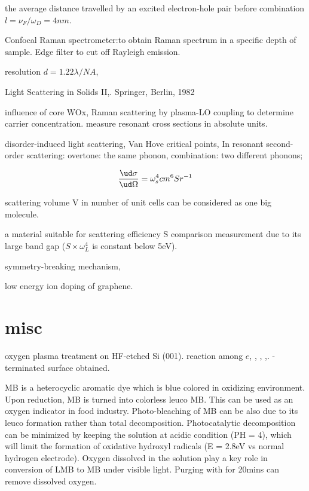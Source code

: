 the average distance travelled by an excited electron-hole pair before combination $l=\nu_F/\omega_D=4nm$.

Confocal Raman spectrometer:to obtain Raman spectrum in a specific depth of sample. Edge filter to cut off Rayleigh emission.

resolution $d= 1.22 \lambda/NA$,

Light Scattering in Solids II,. Springer, Berlin, 1982

influence of core WOx, Raman scattering by plasma-LO coupling to determine carrier concentration. measure resonant cross sections in absolute units.

disorder-induced light scattering, Van Hove critical points,
In resonant second-order scattering:
overtone: the same phonon,
combination: two different phonons;

\[
\frac{\ud\sigma}{\ud\Omega}= \omega_s^4 cm^6 Sr^{-1}
\]

scattering volume V in number of unit cells can be considered as one big molecule.

 a material suitable for scattering efficiency S comparison measurement due to its large band gap ($S\times \omega_L^4$ is constant below 5eV).

symmetry-breaking mechanism,

\cite{Ahlgren2011}  low energy ion doping of graphene.

\section{misc}



oxygen plasma treatment on HF-etched Si (001). reaction among $e$, , , ,. -terminated surface obtained.\cite{Habib2010}

\cite{Wang2014a} MB is a heterocyclic aromatic dye which is blue colored in oxidizing environment. Upon reduction, MB is turned into colorless leuco MB. This can be used as an oxygen indicator in food industry. Photo-bleaching of MB can be also due to its leuco formation rather than total decomposition. Photocatalytic decomposition can be minimized by keeping the solution at acidic condition (PH = 4), which will limit the formation of oxidative hydroxyl radicals (E = 2.8eV vs normal hydrogen electrode). Oxygen dissolved in the solution play a key role in conversion of LMB to MB under visible light. Purging with  for 20mins can remove dissolved oxygen.

